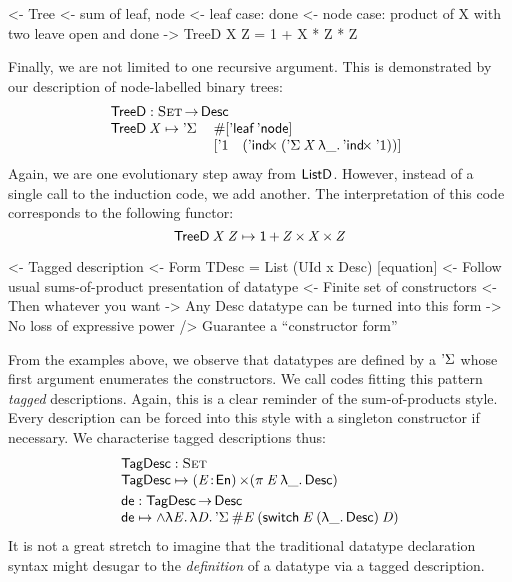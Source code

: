 \begin{wstructure}
<- Tree
    <- sum of leaf, node
    <- leaf case: done
    <- node case: product of X with two leave open and done
    -> TreeD X Z = 1 + X * Z * Z
\end{wstructure}

Finally, we are not limited to one recursive argument. This is
demonstrated by our description of node-labelled binary trees:
%
\[\stk{
\TreeD : \Set \To \Desc \\
\begin{array}{@{}ll}
\TreeD \: \V{X} \mapsto \DSigma{ & \EnumT{\sqr{ \TreeLeaf\: \TreeNode }} \\}
  { & \sqr{ \DUnit \quad
       ( \DIndx{(\DSigma{\V{X}}{\LAM{\_}\DIndx{\DUnit}})})} }
\end{array}
}\]
%
Again, we are one evolutionary step away from $\ListD$. However,
instead of a single call to the induction code, we add another. The
interpretation of this code corresponds to the following functor:
%
\[    \TreeD\: \V{X}\: \V{Z} \mapsto \Unit \mathop{\D{+}} 
          \V{Z} \Prod \V{X}  \Prod \V{Z}     \]


\begin{wstructure}
<- Tagged description
    <- Form TDesc = List (UId x Desc) [equation]
    <- Follow usual sums-of-product presentation of datatype
        <- Finite set of constructors
        <- Then whatever you want
    -> Any Desc datatype can be turned into this form
        -> No loss of expressive power
        /> Guarantee a ``constructor form''
\end{wstructure}

From the examples above, we observe that datatypes are defined by a
$\SYMBDSigma$ whose first argument enumerates the constructors. We
call codes fitting this pattern \emph{tagged} descriptions. Again,
this is a clear reminder of the sum-of-products style. Every
description can be forced into this style with a singleton constructor
if necessary. We characterise tagged descriptions thus:
\[\stk{
 \TagDesc : \Set \\
 \TagDesc \mapsto \SIGMA{\V{E}}{\EnumU} (\spi{\V{E}}{\LAM{\_} \Desc})
\smallskip\\
\SYMBtoDesc : \TagDesc\To\Desc \\
\SYMBtoDesc \mapsto
\spl{\LAM{\V{E}}\LAM{\V{D}}
\DSigma{\EnumT{\V{E}}}{(\F{switch}\:\V{E}\:(\LAM{\_}\Desc)\:\V{D})}}
}\]
It is not a great stretch to imagine that the traditional datatype
declaration syntax might desugar to the \emph{definition} of a datatype
via a tagged description.


